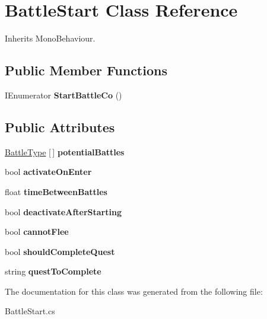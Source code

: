 \hypertarget{class_battle_start}{}\section{Battle\+Start Class Reference}
\label{class_battle_start}


Inherits Mono\+Behaviour.

\subsection*{Public Member Functions}
\begin{DoxyCompactItemize}
\item 
\mbox{\label{class_battle_start_a9e0d01077a2460637a14d1e758f75971}} 
I\+Enumerator {\bfseries Start\+Battle\+Co} ()
\end{DoxyCompactItemize}
\subsection*{Public Attributes}
\begin{DoxyCompactItemize}
\item 
\mbox{\label{class_battle_start_af54d6479ba9b0531d37961b16f0848c7}} 
\mbox{\hyperlink{class_battle_type}{Battle\+Type}} \mbox{[}$\,$\mbox{]} {\bfseries potential\+Battles}
\item 
\mbox{\label{class_battle_start_a37218b5b195e1708605a9aed9b3f2c7d}} 
bool {\bfseries activate\+On\+Enter}
\item 
\mbox{\label{class_battle_start_ac8796074fb4be5d343633f7bbf9b7b70}} 
float {\bfseries time\+Between\+Battles}
\item 
\mbox{\label{class_battle_start_ac9b38d83244062ac3732465b7fa3ad91}} 
bool {\bfseries deactivate\+After\+Starting}
\item 
\mbox{\label{class_battle_start_a11ad211b5415955a8d586b8a272c67f6}} 
bool {\bfseries cannot\+Flee}
\item 
\mbox{\label{class_battle_start_a1d92f31db03dd13aa327250224035ae4}} 
bool {\bfseries should\+Complete\+Quest}
\item 
\mbox{\label{class_battle_start_aa44d23a2c61f98512c7c1c16d580a1f5}} 
string {\bfseries quest\+To\+Complete}
\end{DoxyCompactItemize}


The documentation for this class was generated from the following file\+:\begin{DoxyCompactItemize}
\item 
Battle\+Start.\+cs\end{DoxyCompactItemize}
